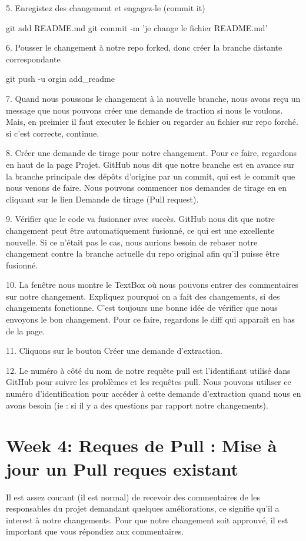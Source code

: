 \documentclass[11pt, onecolumn]{article}
\begin{document}
5. Enregistez des changement et engagez-le (commit it)

git add README.md
git commit -m 'je change le fichier README.md'

6. Pousser le changement à notre repo forked, donc créer la branche distante correspondante

git push -u orgin add_readme

7. Quand nous poussons le changement à la nouvelle branche, nous avons reçu un message que nous pouvons créer une demande de traction si nous le voulons. Mais, en preimier il faut executer le fichier ou regarder au fichier sur repo forché. si c'est correcte, continue.

8. Créer une demande de tirage pour notre changement. Pour ce faire, regardons en haut de la page Projet. GitHub nous dit que notre branche est en avance sur la branche principale des dépôts d'origine par un commit, qui est le commit que nous venons de faire. Nous pouvons commencer nos demandes de tirage en en cliquant sur le lien Demande de tirage (Pull request). 

9. Vérifier que le code va fusionner avec succès. GitHub nous dit que notre changement peut être
automatiquement fusionné, ce qui est une excellente nouvelle.  Si ce n'était pas le cas, nous aurions besoin de rebaser notre changement contre la branche actuelle du repo original afin qu'il puisse être fusionné.

10. La fenêtre nous montre le TextBox où nous pouvons entrer des commentaires sur notre changement. Expliquez pourquoi on a fait des changements, si des changements fonctionne. C'est toujours une bonne idée de vérifier que nous envoyons le bon changement. Pour ce faire, regardons le diff qui apparaît en bas de la page. 

11. Cliquons sur le bouton Créer une demande d'extraction. 

12. Le numéro à côté du nom de notre requête pull est l'identifiant utilisé dans GitHub pour suivre les problèmes et les requêtes pull.  Nous pouvons utiliser ce numéro d'identification pour accéder à cette demande d'extraction quand nous en avons besoin (ie : si il y a des questions par rapport notre changements).


\section{Week 4: Reques de Pull : Mise à jour un Pull reques existant}

Il est assez courant (il est normal) de recevoir des commentaires de les responsables du projet demandant quelques améliorations, ce signifie qu'il a interest à notre changements. Pour que notre changement soit approuvé, il est important que vous répondiez aux commentaires. 
\end{document}
